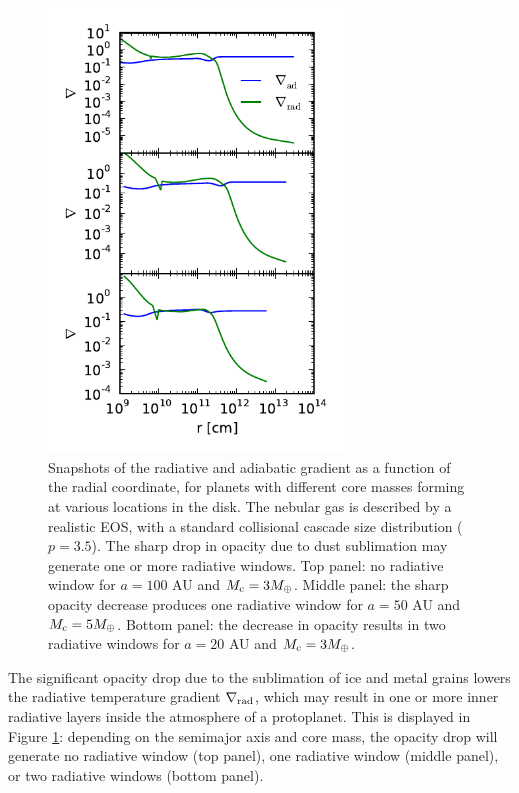\begin{figure}[H]
\centering
\includegraphics[width=0.7\textwidth]{figures/del_vs_r.pdf}
\caption{Snapshots of the radiative and adiabatic gradient as a function of the radial coordinate, for planets with different core masses forming at various locations in the disk. The nebular gas is described by a realistic EOS, with a standard collisional cascade size distribution ($p=3.5$). The sharp drop in opacity due to dust sublimation may generate one or more radiative windows. Top panel: no radiative window for $a=100$ AU and $M_{\rm c}=3 M_{\oplus}$. Middle panel: the sharp opacity decrease produces one radiative window for $a=50$ AU and $M_{\rm c}=5 M_{\oplus}$. Bottom panel: the decrease in opacity results in two radiative windows for $a=20$ AU and $M_{\rm c}=3 M_{\oplus}$.}
\label{fig:delvsr}
\end{figure}

The significant opacity drop due to the sublimation of ice and metal grains lowers the radiative temperature gradient $\nabla_{\rm rad}$, which may result in one or more inner radiative layers inside the atmosphere of a protoplanet. This is displayed in Figure \ref{fig:delvsr}: depending on the semimajor axis and core mass, the opacity drop will generate no radiative window (top panel), one radiative window (middle panel), or two radiative windows (bottom panel). 




